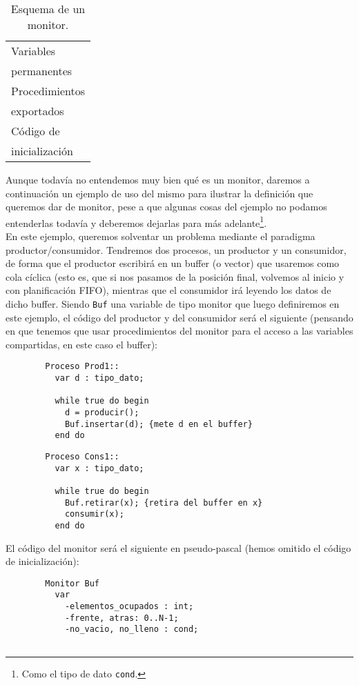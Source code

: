 \begin{table}[H]
\centering
\begin{tabular}{|l|}
\hline
Variables \\
permanentes \\
\hline
Procedimientos \\
exportados \\
\hline
Código de \\ 
inicialización \\
\hline
\end{tabular}
\caption{Esquema de un monitor.}
\label{esq:monitor_1}
\end{table}

\begin{ejemplo}
    Aunque todavía no entendemos muy bien qué es un monitor, daremos a continuación un ejemplo de uso del mismo para ilustrar la definición que queremos dar de monitor, pese a que algunas cosas del ejemplo no podamos entenderlas todavía y deberemos dejarlas para más adelante\footnote{Como el tipo de dato \texttt{cond}.}.\\

    En este ejemplo, queremos solventar un problema mediante el paradigma productor/consumidor. Tendremos dos procesos, un productor y un consumidor, de forma que el productor escribirá en un buffer (o vector) que usaremos como cola cíclica (esto es, que si nos pasamos de la posición final, volvemos al inicio y con planificación FIFO), mientras que el consumidor irá leyendo los datos de dicho buffer. Siendo \verb|Buf| una variable de tipo monitor que luego definiremos en este ejemplo, el código del productor y del consumidor será el siguiente (pensando en que tenemos que usar procedimientos del monitor para el acceso a las variables compartidas, en este caso el buffer):
    \begin{verbatim}
        Proceso Prod1::
          var d : tipo_dato;

          while true do begin
            d = producir();
            Buf.insertar(d); {mete d en el buffer}
          end do
    \end{verbatim}
    \begin{verbatim}
        Proceso Cons1::
          var x : tipo_dato;

          while true do begin
            Buf.retirar(x); {retira del buffer en x}
            consumir(x);
          end do
    \end{verbatim}
    El código del monitor será el siguiente en pseudo-pascal (hemos omitido el código de inicialización):
    \begin{verbatim}
        Monitor Buf
          var
            -elementos_ocupados : int;
            -frente, atras: 0..N-1;
            -no_vacio, no_lleno : cond;


\end{verbatim}
\end{ejemplo}
